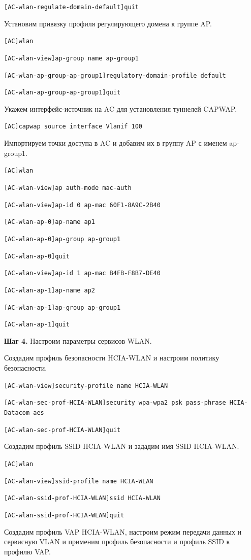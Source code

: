 \texttt{[AC-wlan-regulate-domain-default]quit}

Установим привязку профиля регулирующего домена к группе AP.

\texttt{[AC]wlan}

\texttt{[AC-wlan-view]ap-group name ap-group1}

\texttt{[AC-wlan-ap-group-ap-group1]regulatory-domain-profile default}

\texttt{[AC-wlan-ap-group-ap-group1]quit}

Укажем интерфейс-источник на AC для установления туннелей CAPWAP.

\texttt{[AC]capwap source interface Vlanif 100}

Импортируем точки доступа в AC и добавим их в группу AP с именем ap-group1.

\texttt{[AC]wlan}

\texttt{[AC-wlan-view]ap auth-mode mac-auth}

\texttt{[AC-wlan-view]ap-id 0 ap-mac 60F1-8A9C-2B40}

\texttt{[AC-wlan-ap-0]ap-name ap1}

\texttt{[AC-wlan-ap-0]ap-group ap-group1}

\texttt{[AC-wlan-ap-0]quit}

\texttt{[AC-wlan-view]ap-id 1 ap-mac B4FB-F8B7-DE40}

\texttt{[AC-wlan-ap-1]ap-name ap2}

\texttt{[AC-wlan-ap-1]ap-group ap-group1}

\texttt{[AC-wlan-ap-1]quit}

\textbf{Шаг 4.} Настроим параметры сервисов WLAN.

Создадим профиль безопасности HCIA-WLAN и настроим политику безопасности.

\texttt{[AC-wlan-view]security-profile name HCIA-WLAN}

\texttt{[AC-wlan-sec-prof-HCIA-WLAN]security wpa-wpa2 psk pass-phrase HCIA-Datacom aes}

\texttt{[AC-wlan-sec-prof-HCIA-WLAN]quit}

Создадим профиль SSID HCIA-WLAN и зададим имя SSID HCIA-WLAN.

\texttt{[AC]wlan}

\texttt{[AC-wlan-view]ssid-profile name HCIA-WLAN}

\texttt{[AC-wlan-ssid-prof-HCIA-WLAN]ssid HCIA-WLAN}

\texttt{[AC-wlan-ssid-prof-HCIA-WLAN]quit}

Создадим профиль VAP HCIA-WLAN, настроим режим передачи данных и сервисную VLAN и применим профиль безопасности и профиль SSID к профилю VAP.

